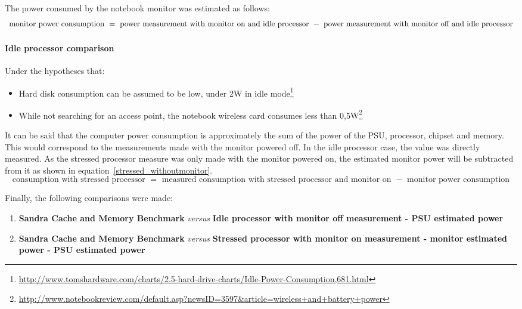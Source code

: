             The power consumed by the notebook monitor was estimated as follows: 
            \begin{equation}
                \text{ monitor power consumption } = \text{ power measurement with monitor on and idle processor }  - 
                \\
                \text{ power measurement with monitor off and idle processor }
                \label{monitor_consumption}
            \end{equation}
            
        \paragraph*{Idle processor comparison}
            Under the hypotheses that: 
            
        \begin{itemize}
            \item Hard disk consumption can be assumed to be low, under 2W in idle mode\footnote{\url{http://www.tomshardware.com/charts/2.5-hard-drive-charts/Idle-Power-Consumption,681.html}}
            \item While not searching for an access point, the notebook wireless card consumes less than 0,5W\footnote{\url{http://www.notebookreview.com/default.asp?newsID=3597&article=wireless+and+battery+power}}
        \end{itemize}
        
            It can be said that the computer power consumption is approximately the sum of the power of the PSU, processor, chipset and memory. This would correspond to the measurements made with the monitor powered off. In the idle processor case, the value was directly measured. As the stressed processor measure was only made with the monitor powered on, the estimated monitor power will be subtracted from it as shown in equation~\ref{stressed_withoutmonitor}.
            \begin{equation}
                \text{ consumption with stressed processor } = \text{ measured consumption with stressed processor and monitor on }  - \text{ monitor power consumption }
                \label{stressed_withoutmonitor}
            \end{equation}
            
            Finally, the following comparisons were made:

            \begin{enumerate}
                \item \textbf{Sandra Cache and Memory Benchmark} \emph{versus} \textbf{Idle processor with monitor off measurement - PSU estimated power}
                \item \textbf{Sandra Cache and Memory Benchmark} \emph{versus} \textbf{Stressed processor with monitor on measurement - monitor estimated power - PSU estimated power}
            \end{enumerate}


